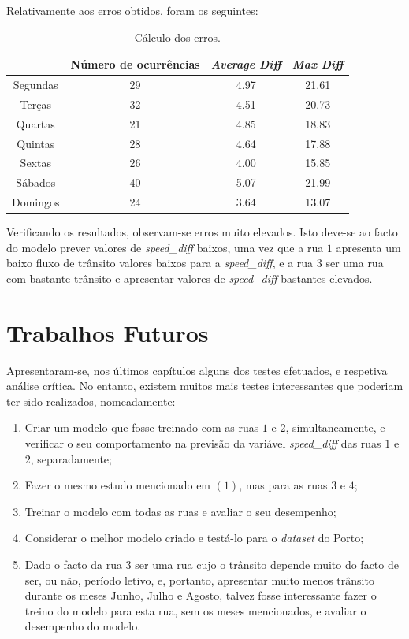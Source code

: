 \documentclass[a4paper, 12pt]{article}
\begin{document}
Relativamente aos erros obtidos, foram os seguintes:

\begin{table}[H]
	\centering
	\begin{tabular}{||c||c|c|c||}
		\hline\hline
		& Número de ocurrências &\textit{Average Diff} & \textit{Max Diff} \\
		\hline\hline
		 Segundas &29 & 4.97
		& 21.61 \\
		\hline
		 Terças  &32&
		4.51
		& 20.73\\
		\hline
		 Quartas & 21&4.85
		
		& 18.83	\\
		\hline
		 Quintas  & 28&
		4.64
		&	17.88\\
		\hline
		 Sextas & 26&
		4.00 & 15.85 \\
		\hline
		 Sábados  &40& 5.07
		& 21.99 \\
		\hline
		 Domingos & 24&
		3.64
		& 13.07
		
		\\
		\hline\hline
	\end{tabular}
	\label{table:mod1_rua3}
	\caption{Cálculo dos erros.}
\end{table}

Verificando os resultados, observam-se erros muito elevados. Isto deve-se ao facto do modelo prever valores de \textit{speed\_diff} baixos, uma vez que a rua $1$ apresenta um baixo fluxo de trânsito valores baixos para a \textit{speed\_diff}, e a rua $3$ ser uma rua com bastante trânsito e apresentar valores de \textit{speed\_diff} bastantes elevados.

\section{Trabalhos Futuros}

Apresentaram-se, nos últimos capítulos alguns dos testes efetuados, e respetiva análise crítica. No entanto, existem muitos mais testes interessantes que poderiam ter sido realizados, nomeadamente:

\begin{enumerate}
	\item Criar um modelo que fosse treinado com as ruas $1$ e $2$, simultaneamente, e verificar o seu comportamento na previsão da variável \textit{speed\_diff} das ruas $1$ e $2$, separadamente;
	\item Fazer o mesmo estudo mencionado em $(1)$, mas para as ruas $3$ e $4$;
	\item Treinar o modelo com todas as ruas e avaliar o seu desempenho;
	\item Considerar o melhor modelo criado e testá-lo para o \textit{dataset} do Porto;
	\item Dado o facto da rua $3$ ser uma rua cujo o trânsito depende muito do facto de ser, ou não, período letivo, e, portanto, apresentar muito menos trânsito durante os meses Junho, Julho e Agosto, talvez fosse interessante fazer o treino do modelo para esta rua, sem os meses mencionados, e avaliar o desempenho do modelo.
\end{enumerate}
\end{document}
